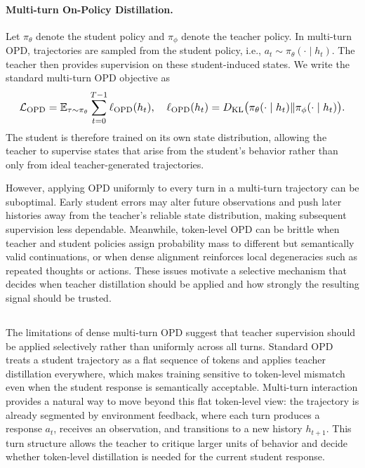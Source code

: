 \paragraph{Multi-turn On-Policy Distillation.}
Let $\pi_\theta$ denote the student policy and $\pi_\phi$ denote the teacher policy.
%
In multi-turn OPD, trajectories are sampled from the student policy, i.e., $a_t\sim\pi_\theta(\cdot\mid h_t)$.
%
The teacher then provides supervision on these student-induced states.
%
We write the standard multi-turn OPD objective as
\begin{equation}
\label{eq:opd_objective}
\resizebox{0.96\columnwidth}{!}{$
\displaystyle
\mathcal{L}_{\mathrm{OPD}}
=
\mathbb{E}_{\tau\sim\pi_\theta}
\sum_{t=0}^{T-1}
\ell_{\mathrm{OPD}}(h_t),
\quad
\ell_{\mathrm{OPD}}(h_t)
=
D_{\mathrm{KL}}
\bigl(
\pi_\theta(\cdot\mid h_t)
\Vert
\pi_\phi(\cdot\mid h_t)
\bigr).
$}
\end{equation}
%
The student is therefore trained on its own state distribution, allowing the teacher to supervise states that arise from the student's behavior rather than only from ideal teacher-generated trajectories.

However, applying OPD uniformly to every turn in a multi-turn trajectory can be suboptimal.
%
Early student errors may alter future observations and push later histories away from the teacher's reliable state distribution, making subsequent supervision less dependable.
%
Meanwhile, token-level OPD can be brittle when teacher and student policies assign probability mass to different but semantically valid continuations, or when dense alignment reinforces local degeneracies such as repeated thoughts or actions.
%
These issues motivate a selective mechanism that decides when teacher distillation should be applied and how strongly the resulting signal should be trusted.

\subsection{\ours{}}
\label{sec:method}

The limitations of dense multi-turn OPD suggest that teacher supervision should be applied selectively rather than uniformly across all turns.
%
Standard OPD treats a student trajectory as a flat sequence of tokens and applies teacher distillation everywhere, which makes training sensitive to token-level mismatch even when the student response is semantically acceptable.
%
Multi-turn interaction provides a natural way to move beyond this flat token-level view: the trajectory is already segmented by environment feedback, where each turn produces a response $a_t$, receives an observation, and transitions to a new history $h_{t+1}$.
%
This turn structure allows the teacher to critique larger units of behavior and decide whether token-level distillation is needed for the current student response.

